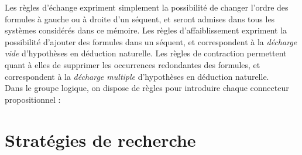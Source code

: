 \documentclass[12pt]{report}
\newcommand{\lto}{\Rightarrow}
\newcommand{\seq}{\vdash}
\newcommand{\irule}[1]{\footnotesize$#1$}
\newcommand{\iruleL}[1]{\irule{{#1}\seq}}
\newcommand{\iruleR}[1]{\irule{\seq{#1}}}
\begin{document}
Les règles d’échange expriment simplement la possibilité de changer l’ordre des formules à gauche ou à droite d’un séquent, et seront admises dans tous les systèmes considérés dans ce mémoire. Les règles d’affaiblissement expriment la possibilité d’ajouter des formules dans un séquent, et correspondent à la \emph{décharge vide} d’hypothèses en déduction naturelle. Les règles de contraction permettent quant à elles de supprimer les occurrences redondantes des formules, et correspondent à la \emph{décharge multiple} d’hypothèses en déduction naturelle.\\

Dans le groupe logique, on dispose de règles pour introduire chaque connecteur propositionnel :


\section{Stratégies de recherche}
\end{document}
